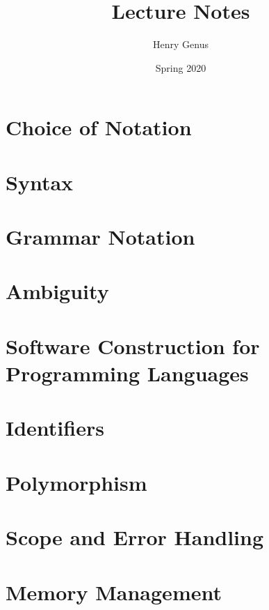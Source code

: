 \documentclass[9pt]{extarticle}
\title{Lecture Notes}
\author{Henry Genus}
\date{Spring 2020}
\begin{document}
\maketitle
\tableofcontents

\newpage
\section{Choice of Notation}


\newpage
\section{Syntax}


\newpage
\section{Grammar Notation}


\newpage
\section{Ambiguity}


\newpage
\section{Software Construction for Programming Languages}


\newpage
\section{Identifiers}


\newpage
\section{Polymorphism}


\newpage
\section{Scope and Error Handling}


\newpage
\section{Memory Management}

\end{document}
